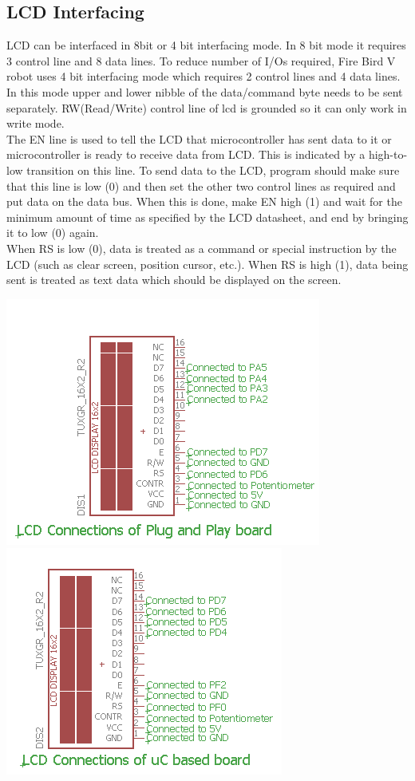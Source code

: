 \documentclass[a4paper,10pt,oneside]{article}
\begin{document}
{	\subsection{\huge \textbf{LCD Interfacing}}{
	LCD can be interfaced in 8bit or 4 bit interfacing mode. In 8 bit mode it requires 3 control line
	and 8 data lines. To reduce number of I/Os required, Fire Bird V robot uses 4 bit interfacing
	mode which requires 2 control lines and 4 data lines. In this mode upper and lower nibble of the
	data/command byte needs to be sent separately. RW(Read/Write) control line of lcd is grounded so it can only work in write mode.\\
	The EN line is used to tell the LCD that microcontroller
	has sent data to it or microcontroller is ready to receive data from LCD. This is indicated by a
	high-to-low transition on this line. To send data to the LCD, program should make sure that this
	line is low (0) and then set the other two control lines as required and put data on the data bus.
	When this is done, make EN high (1) and wait for the minimum amount of time as specified by
	the LCD datasheet, and end by bringing it to low (0) again.\\
	When RS is low (0), data is treated as a command or special
	instruction by the LCD (such as clear screen, position cursor, etc.). When RS is high (1), data
	being sent is treated as text data which should be displayed on the screen.\\}
		\begin{center}
		\includegraphics{lcdPlug} \\
		\vspace{1cm}
		\hspace{2cm}\includegraphics{lcduC} \\

\end{center}}
\end{document}
